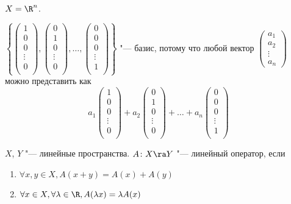 \begin{exmp}
$X = \R^n$.

$\left\{
\begin{pmatrix}
1\\
0\\
0\\
\vdots \\
0\\
\end{pmatrix},
\begin{pmatrix}
0\\
1\\
0\\
\vdots \\
0\\
\end{pmatrix},
\dots,
\begin{pmatrix}
0\\
0\\
0\\
\vdots \\
1\\
\end{pmatrix}
\right\} $ "--- базис, потому что любой вектор 
$\begin{pmatrix}
	a_1\\
	a_2\\
	\vdots \\
	a_n 
\end{pmatrix}$ можно представить как
\[ a_1
\begin{pmatrix}
1\\
0\\
0\\
\vdots \\
0\\
\end{pmatrix}
+a_2
\begin{pmatrix}
0\\
1\\
0\\
\vdots \\
0\\
\end{pmatrix}
+\dots+a_n
\begin{pmatrix}
0\\
0\\
0\\
\vdots \\
1\\
\end{pmatrix} \]
\end{exmp}

\begin{Def}
	$X$, $Y$ "--- линейные пространства.
	$A\colon X \ra Y$ "--- линейный оператор, если
	\begin{enumerate}
		\item $\forall x, y \in X, A(x + y) = A(x) + A(y)$
		\item $\forall x \in X, \forall \lambda \in \R, A(\lambda x) = \lambda A(x)$
	\end{enumerate}
\end{Def}

